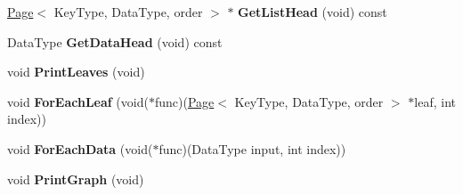 \begin{DoxyCompactItemize}
\item 
\hypertarget{class_data_structures_1_1_b_plus_tree_ab3794a44684972dd5e2d45f7ad895ef5}{\hyperlink{struct_data_structures_1_1_page}{Page}$<$ Key\-Type, Data\-Type, order $>$ $\ast$ {\bfseries Get\-List\-Head} (void) const }\label{class_data_structures_1_1_b_plus_tree_ab3794a44684972dd5e2d45f7ad895ef5}

\item 
\hypertarget{class_data_structures_1_1_b_plus_tree_a60ae9643d4a785271617560704ad984e}{Data\-Type {\bfseries Get\-Data\-Head} (void) const }\label{class_data_structures_1_1_b_plus_tree_a60ae9643d4a785271617560704ad984e}

\item 
\hypertarget{class_data_structures_1_1_b_plus_tree_a13b0bb9cfe607796ac9655531b7c8d27}{void {\bfseries Print\-Leaves} (void)}\label{class_data_structures_1_1_b_plus_tree_a13b0bb9cfe607796ac9655531b7c8d27}

\item 
\hypertarget{class_data_structures_1_1_b_plus_tree_ae9d219abdf3c1e4eb92f86386f02a155}{void {\bfseries For\-Each\-Leaf} (void($\ast$func)(\hyperlink{struct_data_structures_1_1_page}{Page}$<$ Key\-Type, Data\-Type, order $>$ $\ast$leaf, int index))}\label{class_data_structures_1_1_b_plus_tree_ae9d219abdf3c1e4eb92f86386f02a155}

\item 
\hypertarget{class_data_structures_1_1_b_plus_tree_a80e720c175d3bf3612f2cb1777f90053}{void {\bfseries For\-Each\-Data} (void($\ast$func)(Data\-Type input, int index))}\label{class_data_structures_1_1_b_plus_tree_a80e720c175d3bf3612f2cb1777f90053}

\item 
\hypertarget{class_data_structures_1_1_b_plus_tree_aa95c0d019b5d7b34b9a0c56a5b46813a}{void {\bfseries Print\-Graph} (void)}\label{class_data_structures_1_1_b_plus_tree_aa95c0d019b5d7b34b9a0c56a5b46813a}

\end{DoxyCompactItemize}
